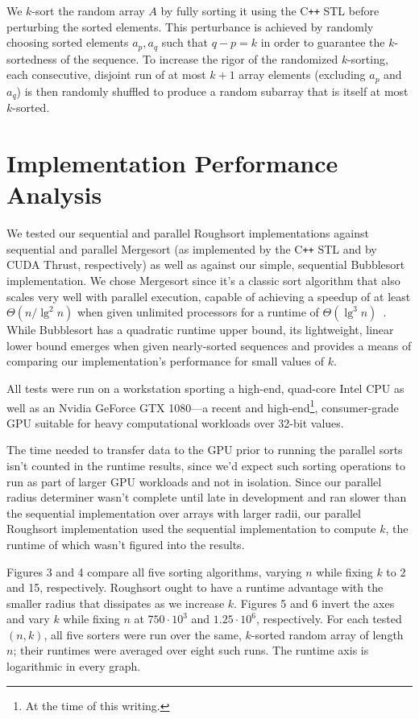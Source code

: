 \documentclass[letterpaper, 12pt]{article}
\let\supercite\cite
\renewcommand{\cite}[1]{\textnormal{~\supercite{#1}}}
\begin{document}
We $k$-sort the random array $A$ by fully sorting it using the C\texttt{++} STL before perturbing the sorted elements.
This perturbance is achieved by randomly choosing sorted elements $a_p, a_q$ such that $q - p = k$ in order to guarantee the
  $k$-sortedness of the sequence.
To increase the rigor of the randomized $k$-sorting, each consecutive, disjoint run of at most $k + 1$ array elements
  (excluding $a_p$ and $a_q$) is then randomly shuffled to produce a random subarray that is itself at most $k$-sorted.

\section{Implementation Performance Analysis}
We tested our sequential and parallel Roughsort implementations against sequential and parallel Mergesort (as implemented by
  the C\texttt{++} STL and by CUDA Thrust, respectively) as well as against our simple, sequential Bubblesort implementation.
We chose Mergesort since it's a classic sort algorithm that also scales very well with parallel execution, capable
  of achieving a speedup of at least $\Theta(n / \lg^2 n)$ when given unlimited processors for a runtime of
  $\Theta(\lg^3 n)$\cite{clrs}.
While Bubblesort has a quadratic runtime upper bound, its lightweight, linear lower bound emerges when given nearly-sorted
  sequences and provides a means of comparing our implementation's performance for small values of $k$.

All tests were run on a workstation sporting a high-end, quad-core Intel CPU as well as an Nvidia GeForce GTX 1080---a
  recent and high-end\footnote{At the time of this writing.}, consumer-grade GPU suitable for heavy computational workloads
  over 32-bit values.

The time needed to transfer data to the GPU prior to running the parallel sorts isn't counted in the runtime results, since we'd
  expect such sorting operations to run as part of larger GPU workloads and not in isolation.
Since our parallel radius determiner wasn't complete until late in development and ran slower than the sequential
  implementation over arrays with larger radii, our parallel Roughsort implementation used the sequential implementation to
  compute $k$, the runtime of which wasn't figured into the results.

Figures 3 and 4 compare all five sorting algorithms, varying $n$ while fixing $k$ to 2 and 15, respectively. Roughsort ought
  to have a runtime advantage with the smaller radius that dissipates as we increase $k$.
Figures 5 and 6 invert the axes and vary $k$ while fixing $n$ at $750 \cdot 10^3$ and $1.25 \cdot 10^6$, respectively. 
For each tested $(n, k)$, all five sorters were run over the same, $k$-sorted random array of length $n$; their runtimes were
  averaged over eight such runs.
The runtime axis is logarithmic in every graph.
\end{document}
